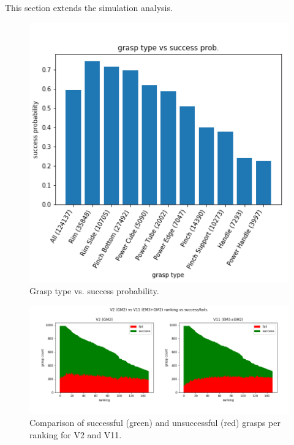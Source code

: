 This section extends the simulation analysis.

\begin{figure}
\centering
\includegraphics[width=0.8\columnwidth]{images/post-analysis/[2] Grasp_type_vs_success_prob.png}
\caption{Grasp type vs. success probability.}
\label{fig:post2}
\end{figure}

\begin{figure}
\centering
\includegraphics[width=0.8\columnwidth]{images/post-analysis/[3] V2_vs_V11_ranking_vs_success_fail.png}
\caption{Comparison of successful (green) and unsuccessful (red) grasps per ranking for V2 and V11.}
\label{fig:post3}
\end{figure}

